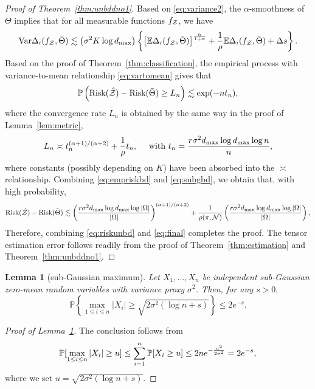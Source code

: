 \documentclass[twoside,11pt]{article}
\theoremstyle{plain}
\newtheorem{lem}{Lemma}
\theoremstyle{definition}
\begin{document}
\begin{proof}[Proof of Theorem~\ref{thm:unbddno1}]
Based on \eqref{eq:variance2}, the $\alpha$-smoothness of $\Theta$ implies that for all measurable functions $f_{\mathcal{Z}}$, we have
\begin{align}\label{eq:vartomean}
\text{Var}\Delta_i(f_{\mathcal{Z}},\bar \Theta)\lesssim \left(\sigma^2K\log d_{\max}\right) \left\{\left[\mathbb{E}\Delta_i(f_{\mathcal{Z}},\bar \Theta)\right]^{\alpha\over1+\alpha}+\frac{1}{\rho}\mathbb{E}\Delta_i(f_{\mathcal{Z}},\bar \Theta)+\Delta s\right\}.
\end{align}
Based on the proof of Theorem~\ref{thm:classification}, the empirical process with variance-to-mean relationship  \eqref{eq:vartomean} gives that
\begin{align}\label{eq:empriskbd}
\mathbb{P	}\left(\text{Risk}(\hat{\mathcal{Z}})-\text{Risk}(\bar\Theta)\geq L_n\right)\lesssim \exp(-nt_n),
\end{align}
where the convergence rate $L_n$ is obtained by the same way in the proof of Lemma~\ref{lem:metric}, 
\begin{align}\label{eq:subgbd}
L_n\asymp t_n^{(\alpha+1)/(\alpha+2)}+\frac{1}{\rho}t_n,\quad\text{ with } t_n =  {r \sigma^2 d_{\max}\log d_{\max}\log n  \over n},
\end{align}
where constants (possibly depending on $K$) have been absorbed into the $\asymp$ relationship.
Combining \eqref{eq:empriskbd} and \eqref{eq:subgbd}, we obtain that, with high probability, 
\begin{align}\label{eq:riskunbd}
   \text{Risk}(\hat{\mathcal{Z}})-\text{Risk}(\bar\Theta)\lesssim \left( {r \sigma^2  d_{\max}\log d_{\max}\log|\Omega|  \over |\Omega|}\right)^{(\alpha+1)/(\alpha+2)}+\frac{1}{\rho(\pi,\mathcal{N})} \left({r \sigma^2  d_{\max} \log d_{\max}\log|\Omega| \over |\Omega|} \right),
\end{align} 
 Therefore, combining \eqref{eq:riskunbd} and \eqref{eq:final} completes the proof. The tensor estimation error follows readily from the proof of Theorem~\ref{thm:estimation} and Theorem~\ref{thm:unbddno1}.
\end{proof}




\begin{lem}[sub-Gaussian maximum]\label{lem:subg}
Let $X_1,\ldots,X_n$ be independent sub-Gaussian zero-mean random variables with variance proxy $\sigma^2$. Then, for any $s>0,$
\[\mathbb{P}\left\{\max_{1\leq i\leq n}|X_i|\geq\sqrt{2\sigma^2(\log n +s)}\right\}\leq2 e^{-s}.\]
\end{lem}
\begin{proof}[Proof of Lemma~\ref{lem:subg}]
The conclusion follows from
\begin{align}
\mathbb{P}[\max_{1\leq i\leq n}|X_i|\geq u] \leq \sum_{i=1}^n\mathbb{P}[X_i\geq u]\leq 2n e^{-{u^2\over 2\sigma^2}} = 2e^{-s},
\end{align}
where we set $u = \sqrt{2\sigma^2(\log n+s)}.$
\end{proof}
\end{document}
